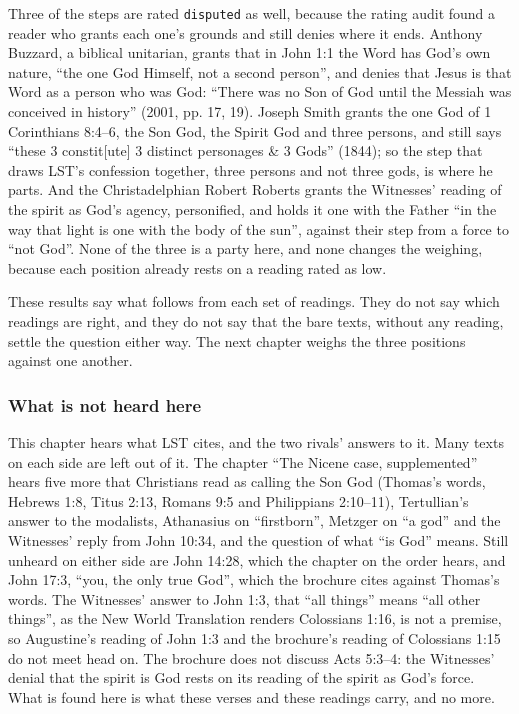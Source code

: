 \documentclass[11pt,paper=\testimonypaper,DIV=13,parskip=false]{scrartcl}
\begin{document}
Three of the steps are rated \texttt{disputed} as well, because the rating audit found a reader who grants each one’s grounds and still denies where it ends. Anthony Buzzard, a biblical unitarian, grants that in John 1:1 the Word has God’s own nature, “the one God Himself, not a second person”, and denies that Jesus is that Word as a person who was God: “There was no Son of God until the Messiah was conceived in history” (2001, pp. 17, 19). Joseph Smith grants the one God of 1 Corinthians 8:4–6, the Son God, the Spirit God and three persons, and still says “these 3 constit[ute] 3 distinct personages \& 3 Gods” (1844); so the step that draws LST’s confession together, three persons and not three gods, is where he parts. And the Christadelphian Robert Roberts grants the Witnesses’ reading of the spirit as God’s agency, personified, and holds it one with the Father “in the way that light is one with the body of the sun”, against their step from a force to “not God”. None of the three is a party here, and none changes the weighing, because each position already rests on a reading rated as low.

These results say what follows from each set of readings. They do not say which readings are right, and they do not say that the bare texts, without any reading, settle the question either way. The next chapter weighs the three positions against one another.

\subsubsection*{What is not heard here}
This chapter hears what LST cites, and the two rivals’ answers to it. Many texts on each side are left out of it. The chapter “The Nicene case, supplemented” hears five more that Christians read as calling the Son God (Thomas’s words, Hebrews 1:8, Titus 2:13, Romans 9:5 and Philippians 2:10–11), Tertullian’s answer to the modalists, Athanasius on “firstborn”, Metzger on “a god” and the Witnesses’ reply from John 10:34, and the question of what “is God” means. Still unheard on either side are John 14:28, which the chapter on the order hears, and John 17:3, “you, the only true God”, which the brochure cites against Thomas’s words. The Witnesses’ answer to John 1:3, that “all things” means “all other things”, as the New World Translation renders Colossians 1:16, is not a premise, so Augustine’s reading of John 1:3 and the brochure’s reading of Colossians 1:15 do not meet head on. The brochure does not discuss Acts 5:3–4: the Witnesses’ denial that the spirit is God rests on its reading of the spirit as God’s force. What is found here is what these verses and these readings carry, and no more.
\end{document}
